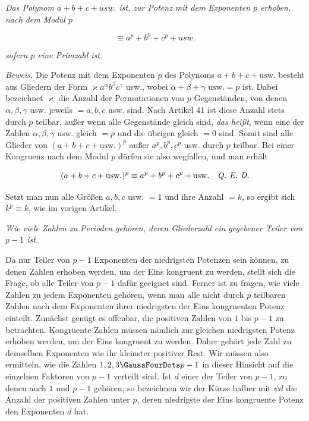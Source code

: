
\emph{Das Polynom $a+b+c+\mathit{usw.}$ ist, zur Potenz mit dem Exponenten $p$ erhoben, nach dem Modul $p$}

\[\equiv a^p+b^p+c^p+\mathit{usw.}\]

\noindent\emph{sofern $p$ eine Primzahl ist.}

\emph{Beweis.} Die Potenz mit dem Exponenten $p$ des Polynoms $a+b+c+\text{usw.}$ besteht aus Gliedern der Form $\varkappa a^\alpha b^\beta c^\gamma$ usw., wobei $\alpha+\beta+\gamma\text{ usw.}=p$ ist. Dabei bezeichnet $\varkappa$ die Anzahl der Permutationen von $p$ Gegenständen, von denen $\alpha,\beta,\gamma$ usw. jeweils $=a,b,c$ usw. sind. Nach Artikel 41 ist diese Anzahl stets durch $p$ teilbar, außer wenn alle Gegenstände gleich sind, \emph{das heißt}, wenn eine der Zahlen $\alpha,\beta,\gamma$ usw. gleich $=p$ und die übrigen gleich $=0$ sind. Somit sind alle Glieder von $(a+b+c+\text{usw.})^p$ außer $a^p,b^p,c^p$ usw. durch $p$ teilbar. Bei einer Kongruenz nach dem Modul $p$ dürfen sie also wegfallen, und man erhält

\[(a+b+c+\mathrm{usw.})^p\equiv a^p+b^p+c^p+\mathrm{usw.}\quad\text{\emph{Q. E. D.}}\]

Setzt man nun alle Größen $a,b,c$ usw. $=1$ und ihre Anzahl $=k$, so ergibt sich $k^p\equiv k$, wie im vorigen Artikel.

\begin{center}\emph{Wie viele Zahlen zu Perioden gehören, deren Gliederzahl ein gegebener Teiler von $p-1$ ist.}\end{center}


Da nur Teiler von $p-1$ Exponenten der niedrigsten Potenzen sein können, zu denen Zahlen erhoben werden, um der Eins kongruent zu werden, stellt sich die Frage, ob alle Teiler von $p-1$ dafür geeignet sind. Ferner ist zu fragen, wie viele Zahlen zu jedem Exponenten gehören, wenn man alle nicht durch $p$ teilbaren Zahlen nach dem Exponenten ihrer niedrigsten der Eins kongruenten Potenz einteilt. Zunächst genügt es offenbar, die positiven Zahlen
von $1$ bis $p-1$ zu betrachten. Kongruente Zahlen müssen nämlich zur gleichen niedrigsten Potenz erhoben werden, um der Eins kongruent zu werden. Daher gehört jede Zahl zu demselben Exponenten wie ihr kleinster positiver Rest. Wir müssen also ermitteln, wie die Zahlen $1,2,3\GaussFourDots p-1$ in dieser Hinsicht auf die einzelnen Faktoren von $p-1$ verteilt sind. Ist $d$ einer der Teiler von $p-1$, zu denen auch $1$ und $p-1$ gehören, so bezeichnen wir der Kürze halber mit $\psi d$ die Anzahl der positiven Zahlen unter $p$, deren niedrigste der Eins kongruente Potenz den Exponenten $d$ hat.

